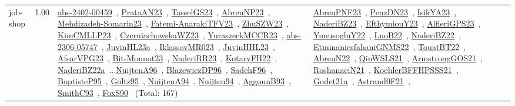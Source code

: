 {\begin{longtable}{p{3cm}r>{\raggedright\arraybackslash}p{6cm}>{\raggedright\arraybackslash}p{6cm}>{\raggedright\arraybackslash}p{8cm}}
\index{job-shop}\index{Concepts!job-shop}job-shop &  1.00 & \href{../works/abs-2402-00459.pdf}{abs-2402-00459}~\cite{abs-2402-00459}, \href{../works/PrataAN23.pdf}{PrataAN23}~\cite{PrataAN23}, \href{../works/TasselGS23.pdf}{TasselGS23}~\cite{TasselGS23}, \href{../works/AbreuNP23.pdf}{AbreuNP23}~\cite{AbreuNP23}, \href{../works/Mehdizadeh-Somarin23.pdf}{Mehdizadeh-Somarin23}~\cite{Mehdizadeh-Somarin23}, \href{../works/Fatemi-AnarakiTFV23.pdf}{Fatemi-AnarakiTFV23}~\cite{Fatemi-AnarakiTFV23}, \href{../works/ZhuSZW23.pdf}{ZhuSZW23}~\cite{ZhuSZW23}, \href{../works/KimCMLLP23.pdf}{KimCMLLP23}~\cite{KimCMLLP23}, \href{../works/CzerniachowskaWZ23.pdf}{CzerniachowskaWZ23}~\cite{CzerniachowskaWZ23}, \href{../works/YuraszeckMCCR23.pdf}{YuraszeckMCCR23}~\cite{YuraszeckMCCR23}, \href{../works/abs-2306-05747.pdf}{abs-2306-05747}~\cite{abs-2306-05747}, \href{../works/JuvinHL23a.pdf}{JuvinHL23a}~\cite{JuvinHL23a}, \href{../works/IklassovMR023.pdf}{IklassovMR023}~\cite{IklassovMR023}, \href{../works/JuvinHHL23.pdf}{JuvinHHL23}~\cite{JuvinHHL23}, \href{../works/AfsarVPG23.pdf}{AfsarVPG23}~\cite{AfsarVPG23}, \href{../works/Bit-Monnot23.pdf}{Bit-Monnot23}~\cite{Bit-Monnot23}, \href{../works/NaderiRR23.pdf}{NaderiRR23}~\cite{NaderiRR23}, \href{../works/KotaryFH22.pdf}{KotaryFH22}~\cite{KotaryFH22}, \href{../works/NaderiBZ22a.pdf}{NaderiBZ22a}~\cite{NaderiBZ22a}...\href{../works/NuijtenA96.pdf}{NuijtenA96}~\cite{NuijtenA96}, \href{../works/BlazewiczDP96.pdf}{BlazewiczDP96}~\cite{BlazewiczDP96}, \href{../works/SadehF96.pdf}{SadehF96}~\cite{SadehF96}, \href{../works/BaptisteP95.pdf}{BaptisteP95}~\cite{BaptisteP95}, \href{../works/Goltz95.pdf}{Goltz95}~\cite{Goltz95}, \href{../works/NuijtenA94.pdf}{NuijtenA94}~\cite{NuijtenA94}, \href{../works/Nuijten94.pdf}{Nuijten94}~\cite{Nuijten94}, \href{../works/AggounB93.pdf}{AggounB93}~\cite{AggounB93}, \href{../works/SmithC93.pdf}{SmithC93}~\cite{SmithC93}, \href{../works/FoxS90.pdf}{FoxS90}~\cite{FoxS90} (Total: 167) & \href{../works/AbreuPNF23.pdf}{AbreuPNF23}~\cite{AbreuPNF23}, \href{../works/PenzDN23.pdf}{PenzDN23}~\cite{PenzDN23}, \href{../works/IsikYA23.pdf}{IsikYA23}~\cite{IsikYA23}, \href{../works/NaderiBZ23.pdf}{NaderiBZ23}~\cite{NaderiBZ23}, \href{../works/EfthymiouY23.pdf}{EfthymiouY23}~\cite{EfthymiouY23}, \href{../works/AlfieriGPS23.pdf}{AlfieriGPS23}~\cite{AlfieriGPS23}, \href{../works/YunusogluY22.pdf}{YunusogluY22}~\cite{YunusogluY22}, \href{../works/LuoB22.pdf}{LuoB22}~\cite{LuoB22}, \href{../works/NaderiBZ22.pdf}{NaderiBZ22}~\cite{NaderiBZ22}, \href{../works/EtminaniesfahaniGNMS22.pdf}{EtminaniesfahaniGNMS22}~\cite{EtminaniesfahaniGNMS22}, \href{../works/TouatBT22.pdf}{TouatBT22}~\cite{TouatBT22}, \href{../works/AbreuN22.pdf}{AbreuN22}~\cite{AbreuN22}, \href{../works/QinWSLS21.pdf}{QinWSLS21}~\cite{QinWSLS21}, \href{../works/ArmstrongGOS21.pdf}{ArmstrongGOS21}~\cite{ArmstrongGOS21}, \href{../works/RoshanaeiN21.pdf}{RoshanaeiN21}~\cite{RoshanaeiN21}, \href{../works/KoehlerBFFHPSSS21.pdf}{KoehlerBFFHPSSS21}~\cite{KoehlerBFFHPSSS21}, \href{../works/Godet21a.pdf}{Godet21a}~\cite{Godet21a}, \href{../works/Astrand0F21.pdf}{Astrand0F21}~\cite{Astrand0F21}, 
\end{longtable}}

